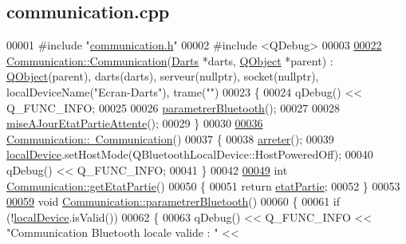 \hypertarget{communication_8cpp_source}{}\subsection{communication.\+cpp}

\begin{DoxyCode}
00001 \textcolor{preprocessor}{#include "\hyperlink{communication_8h}{communication.h}"}
00002 \textcolor{preprocessor}{#include <QDebug>}
00003 
\hyperlink{class_communication_a6dd505094f1af1ccd25c6b75c18636d6}{00022} \hyperlink{class_communication_a6dd505094f1af1ccd25c6b75c18636d6}{Communication::Communication}(\hyperlink{class_darts}{Darts} *darts, 
      \hyperlink{class_q_object}{QObject} *parent) : \hyperlink{class_q_object}{QObject}(parent), darts(darts), serveur(nullptr), socket(nullptr), 
      localDeviceName(\textcolor{stringliteral}{"Ecran-Darts"}), trame(\textcolor{stringliteral}{""})
00023 \{
00024     qDebug() << Q\_FUNC\_INFO;
00025 
00026     \hyperlink{class_communication_abe2349c8e1d9536a73c8741425ba867f}{parametrerBluetooth}();
00027 
00028     \hyperlink{class_communication_a72557be8ab858096e03f08e78e036aeb}{miseAJourEtatPartieAttente}();
00029 \}
00030 
\hyperlink{class_communication_a75ba08ce908d45251e28e4c1db94e6f4}{00036} \hyperlink{class_communication_a75ba08ce908d45251e28e4c1db94e6f4}{Communication::~Communication}()
00037 \{
00038     \hyperlink{class_communication_a1f4b02441803f9c8e231cb9f304d776b}{arreter}();
00039     \hyperlink{class_communication_a6281796eab7523bef6be1a766e0e906f}{localDevice}.setHostMode(QBluetoothLocalDevice::HostPoweredOff);
00040     qDebug() << Q\_FUNC\_INFO;
00041 \}
00042 
\hyperlink{class_communication_a977495ad03ddf275aae49184c9a0dd1a}{00049} \textcolor{keywordtype}{int} \hyperlink{class_communication_a977495ad03ddf275aae49184c9a0dd1a}{Communication::getEtatPartie}()
00050 \{
00051     \textcolor{keywordflow}{return} \hyperlink{class_communication_a2539ded2780db2c732690c585c768c96}{etatPartie};
00052 \}
00053 
\hyperlink{class_communication_abe2349c8e1d9536a73c8741425ba867f}{00059} \textcolor{keywordtype}{void} \hyperlink{class_communication_abe2349c8e1d9536a73c8741425ba867f}{Communication::parametrerBluetooth}()
00060 \{
00061     \textcolor{keywordflow}{if} (!\hyperlink{class_communication_a6281796eab7523bef6be1a766e0e906f}{localDevice}.isValid())
00062     \{
00063         qDebug() << Q\_FUNC\_INFO << \textcolor{stringliteral}{"Communication Bluetooth locale valide : "} << 

\end{DoxyCode}
